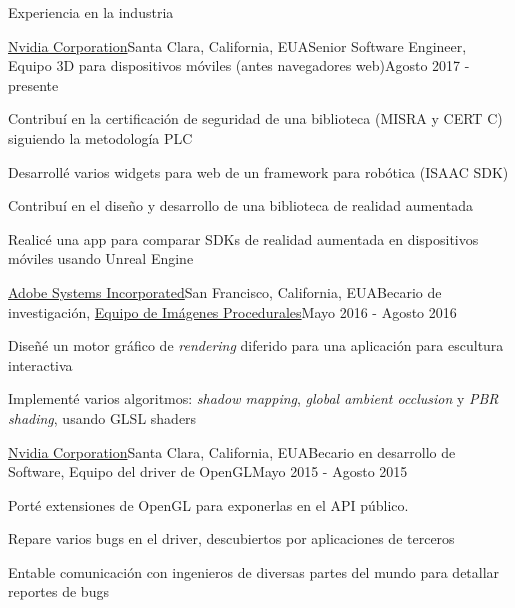 \documentclass{resume} %
\begin{document}

\begin{rSection}{Experiencia en la industria}

\begin{rSubsection}{\href{http://www.nvidia.com}{Nvidia Corporation}}{Santa Clara, California, EUA}{Senior Software Engineer, Equipo 3D para dispositivos móviles (antes navegadores web)}{Agosto 2017 - presente}
\item Contribuí en la certificación de seguridad de una biblioteca (MISRA y CERT C) siguiendo la metodología PLC
\item Desarrollé varios widgets para web de un framework para robótica (ISAAC SDK)
\item Contribuí en el diseño y desarrollo de una biblioteca de realidad aumentada
\item Realicé una app para comparar SDKs de realidad aumentada en dispositivos móviles usando Unreal Engine
\end{rSubsection}

\begin{rSubsection}{\href{http://www.adobe.com/}{Adobe Systems Incorporated}}{San Francisco, California, EUA}{Becario de investigación, \href{http://research.adobe.com/}{Equipo de Imágenes Procedurales}}{Mayo 2016 - Agosto 2016}
\item Diseñé un motor gráfico de \emph{rendering} diferido para una aplicación para escultura interactiva
\item Implementé varios algoritmos: \emph{shadow mapping}, \emph{global ambient occlusion} y \emph{PBR shading}, usando GLSL shaders
\end{rSubsection}

\begin{rSubsection}{\href{http://www.nvidia.com}{Nvidia Corporation}}{Santa Clara, California, EUA}{Becario en desarrollo de Software, Equipo del driver de OpenGL}{Mayo 2015 - Agosto 2015}
\item Porté extensiones de OpenGL para exponerlas en el API público.
\item Repare varios bugs en el driver, descubiertos por aplicaciones de terceros
\item Entable comunicación con ingenieros de diversas partes del mundo para detallar reportes de bugs
\end{rSubsection}


\end{rSection}
\end{document}
